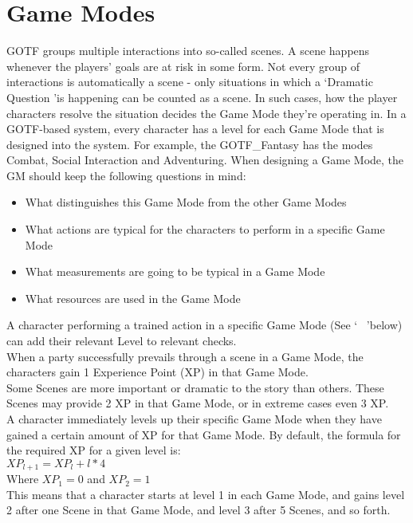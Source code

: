\section{Game Modes}\label{sec:gamemodes}
GOTF groups multiple interactions into so-called scenes.
A scene happens whenever the players' goals are at risk in some form.
Not every group of interactions is automatically a scene - only situations in which a \lq Dramatic Question \rq is happening can be counted as a scene.
In such cases, how the player characters resolve the situation decides the Game Mode they're operating in.
In a GOTF-based system, every character has a level for each Game Mode that is designed into the system.
For example, the GOTF\_Fantasy has the modes Combat, Social Interaction and Adventuring.
When designing a Game Mode, the GM should keep the following questions in mind:
\begin{itemize}
    \item What distinguishes this Game Mode from the other Game Modes
    \item What actions are typical for the characters to perform in a specific Game Mode
    \item What measurements are going to be typical in a Game Mode
    \item What resources are used in the Game Mode
\end{itemize}

A character performing a trained action in a specific Game Mode (See \lq ~ \rq below) can add their relevant Level to relevant checks.\\
When a party successfully prevails through a scene in a Game Mode, the characters gain 1 Experience Point (XP) in that Game Mode.\\
Some Scenes are more important or dramatic to the story than others.
These Scenes may provide 2 XP in that Game Mode, or in extreme cases even 3 XP.\\
A character immediately levels up their specific Game Mode when they have gained a certain amount of XP for that Game Mode.
By default, the formula for the required XP for a given level is:\\
$XP_{l+1} = XP_{l} + l * 4$\\
Where $XP_{1} = 0$ and $XP_{2} = 1$\\
This means that a character starts at level 1 in each Game Mode, and gains level 2 after one Scene in that Game Mode, and level 3 after 5 Scenes, and so forth.\\

